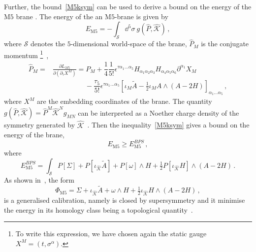 \documentclass[debug]{phd}
\begin{document}
	Further, the bound~\eqref{M5ksym} can be used to derive a bound on the energy of the $\mathrm{M}5$ brane \cite{MS03,Gabella:2012rc}. The energy of the an $\mathrm{M}5$-brane is given by 
		\begin{equation}
		\label{energyM5}
			E_{\mathrm{M}5} =- \int_{\mathcal{S}} \dd ^5 \sigma\ g(\hat{P},\hat{\mathcal{K}}) \, , 
		\end{equation}
	where $\mathcal{S}$ denotes the $5$-dimensional world-space of the brane, $\hat{P}_M$ is the conjugate momentum%
		\footnote{%
		To write this expression, we have chosen again the static gauge $X^M = ( t, \sigma^\alpha )$.%
		}~\cite{Bergshoeff:1998vx},
		\begin{equation}
			\begin{split}
				\hat{P}_M =& \frac{\partial L_{M 5}}{\partial (\partial_\tau X^M)} = P_M + \dfrac{1}{4} \dfrac{1}{5!} \epsilon^{\tau \alpha _1\ldots\alpha _5} H_{\alpha _1 \alpha _2\alpha _3}H_{\alpha _4\alpha _5\alpha _6} \partial^{\alpha _1} X_M \\
						&\phantom{= P_M + + } - \dfrac{\tau_5}{5!} \epsilon^{\tau \alpha _1\ldots\alpha _5}\left[ \iota_M \tilde{A} - \tfrac{1}{2} \iota_M A \wedge (A - 2 H)\right]_{ \alpha _1\ldots\alpha _5} \, ,
			\end{split}
		\end{equation}
	where $X^M$ are the embedding coordinates of the brane. 
	The quantity $g(\hat{P},\hat{\mathcal{K}}) = \hat{P}^M \hat{\mathcal{K}}^N g_{MN}$ can be interpreted as a Noether charge density of the symmetry generated by $\hat{\mathcal{K}}$~\cite{Martucci:2011dn}. 
	Then the inequality~\eqref{M5ksym} gives a bound on the energy of the brane,
		\begin{equation}
		\label{BPScon}
			E_{\mathrm{M}5} \geq E^{BPS}_{\mathrm{M}5}\, ,
		\end{equation}
	where
		\begin{equation}
			E^{BPS}_{\mathrm{M}5} = \int_{\mathcal{S}} P[\Sigma] + P[\iota_{\hat{\mathcal{K}}} \tilde{A}] + P[\omega] \wedge H + \tfrac{1}{2} P[\iota_{\hat{\mathcal{K}}} H] \wedge (A - 2H)\, .
		\end{equation}
	As shown in~\cite{Gabella:2012rc}, the form
		\begin{equation}
		\label{genkcal}
			\Phi_{\mathrm{M}5} = \Sigma + \iota_{\hat{\mathcal{K}}} \tilde{A}+\omega \wedge H + \tfrac{1}{2} \iota_{\hat{\mathcal{K}}} H \wedge (A - 2H)\, ,
		\end{equation}
	is a generalised calibration, namely is closed by supersymmetry and it minimise the energy in its homology class being a topological quantity~\cite{MS03}.
\end{document}

